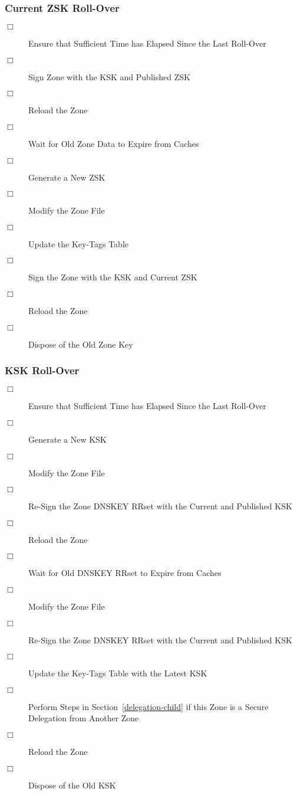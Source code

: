 
\clearpage
\subsubsection{Current ZSK Roll-Over}

\begin{description}
\item [$\Box$] Ensure that Sufficient Time has Elapsed Since the Last Roll-Over
\item [$\Box$] Sign Zone with the KSK and Published ZSK
\item [$\Box$] Reload the Zone
\item [$\Box$] Wait for Old Zone Data to Expire from Caches
\item [$\Box$] Generate a New ZSK
\item [$\Box$] Modify the Zone File
\item [$\Box$] Update the Key-Tags Table
\item [$\Box$] Sign the Zone with the KSK and Current ZSK
\item [$\Box$] Reload the Zone
\item [$\Box$] Dispose of the Old Zone Key
\end{description}


\subsubsection{KSK Roll-Over}

\begin{description}
\item [$\Box$] Ensure that Sufficient Time has Elapsed Since the Last Roll-Over
\item [$\Box$] Generate a New KSK
\item [$\Box$] Modify the Zone File
\item [$\Box$] Re-Sign the Zone DNSKEY RRset with the Current and Published KSK
\item [$\Box$] Reload the Zone
\item [$\Box$] Wait for Old DNSKEY RRset to Expire from Caches
\item [$\Box$] Modify the Zone File
\item [$\Box$] Re-Sign the Zone DNSKEY RRset with the Current and Published KSK
\item [$\Box$] Update the Key-Tags Table with the Latest KSK
\item [$\Box$] Perform Steps in Section~\ref{delegation-child} if this Zone is a Secure Delegation from Another Zone
\item [$\Box$] Reload the Zone
\item [$\Box$] Dispose of the Old KSK
\end{description}

